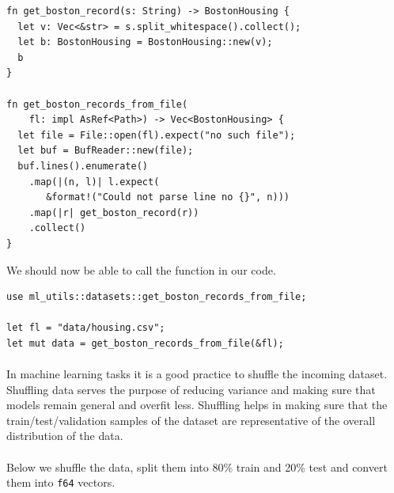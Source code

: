 \documentclass{book}
\begin{document}
\begin{lstlisting}[caption={chapter2\\/ml\\-utils\\/src\\/datasets\\.rs}]
fn get_boston_record(s: String) -> BostonHousing {
  let v: Vec<&str> = s.split_whitespace().collect();
  let b: BostonHousing = BostonHousing::new(v);
  b
}

fn get_boston_records_from_file(
    fl: impl AsRef<Path>) -> Vec<BostonHousing> {
  let file = File::open(fl).expect("no such file");
  let buf = BufReader::new(file);
  buf.lines().enumerate()
    .map(|(n, l)| l.expect(
       &format!("Could not parse line no {}", n)))
    .map(|r| get_boston_record(r))
    .collect()
}
\end{lstlisting}


We should now be able to call the function in our code.

\begin{lstlisting}[caption={chapter2\\/rustlymachine\_regression\\/src\\/lin\_reg\\.rs}]
use ml_utils::datasets::get_boston_records_from_file;

let fl = "data/housing.csv";
let mut data = get_boston_records_from_file(&fl);
\end{lstlisting}

\paragraph{}%
In machine learning tasks it is a good practice to shuffle the incoming dataset. Shuffling data serves the purpose of reducing variance and making sure that models remain general and overfit less. Shuffling helps in making sure that the train/test/validation samples of the dataset are representative of the overall distribution of the data.
\label{par:}

\paragraph{}%
Below we shuffle the data, split them into 80\% train and 20\% test and convert them into \lstinline{f64} vectors.
\label{par:}
\end{document}

